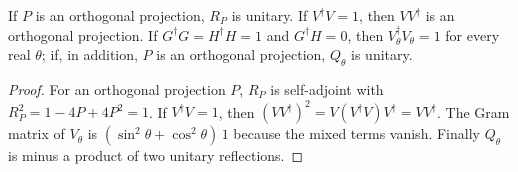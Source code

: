 \begin{theorem}
    \label{thm:gate_amplification_reflections}
    \leanok
    If $P$ is an orthogonal projection, $R_P$ is unitary. If
    $V^\dagger V=1$, then $VV^\dagger$ is an orthogonal projection. If
    $G^\dagger G=H^\dagger H=1$ and $G^\dagger H=0$, then
    $V_\theta^\dagger V_\theta=1$ for every real $\theta$; if, in addition, $P$
    is an orthogonal projection, $Q_\theta$ is unitary.
\end{theorem}
\begin{proof}\leanok
    For an orthogonal projection $P$, $R_P$ is self-adjoint with
    $R_P^2=1-4P+4P^2=1$. If $V^\dagger V=1$, then
    $(VV^\dagger)^2=V(V^\dagger V)V^\dagger=VV^\dagger$. The Gram matrix of
    $V_\theta$ is $(\sin^2\theta+\cos^2\theta)\,1$ because the mixed terms
    vanish. Finally $Q_\theta$ is minus a product of two unitary
    reflections.
\end{proof}

